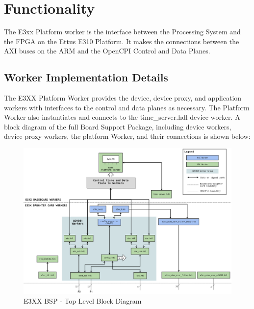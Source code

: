 \documentclass{article}
\begin{document}
\section*{Functionality}
\begin{flushleft}
The E3xx Platform worker is the interface between the Processing System and the FPGA on the Ettus E310 Platform. It makes the connections between the AXI buses on the ARM and the OpenCPI Control and Data Planes.

\end{flushleft}
\begin{landscape}
\section*{Worker Implementation Details}
\begin{flushleft}
The E3XX Platform Worker provides the device, device proxy, and application workers with interfaces to the control and data planes as necessary. The Platform Worker also instantiates and connects to the time\_server.hdl device worker. A block diagram of the full Board Support Package, including device workers, device proxy workers, the platform Worker, and their connections is shown below:\\
\begin{figure}[ht]
	\centerline{\includegraphics[scale=0.45]{E310_BSP}}
	\caption{E3XX BSP - Top Level Block Diagram}
	\label{fig:top}
\end{figure}
\end{flushleft}
\end{landscape}
\end{document}

